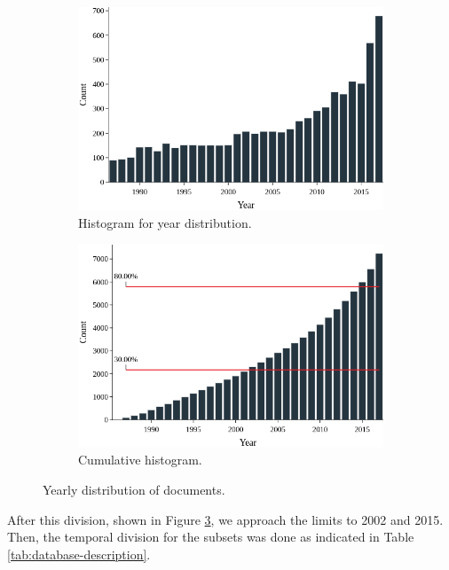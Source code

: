 \begin{figure}[h!]
	\begin{subfigure}{0.49\textwidth}
		\includegraphics[width=\linewidth]{01.Chapters/04.Materials/yearly-histogram}
		\caption{Histogram for year distribution.} \label{fig:yearly-histogram}
	\end{subfigure}%
	\hfill
	\begin{subfigure}{0.49\textwidth}
		\includegraphics[width=\linewidth]{01.Chapters/04.Materials/yearly-cumulative}
		\caption{Cumulative histogram.} \label{fig:yearly-cumulative}
	\end{subfigure}%
	\caption{Yearly distribution of documents.}
	\label{fig:yearly-distribution}
\end{figure}

After this division, shown in Figure \ref{fig:yearly-distribution}, we approach the limits to 2002 and 2015. Then, the temporal division for the subsets was done as indicated in Table \ref{tab:database-description}.

